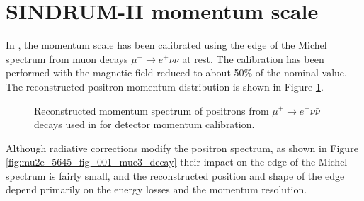 \newpage
\section {SINDRUM-II momentum scale }

In \cite{sindrum_ii:Bertl2006}, the momentum scale has been calibrated using
the edge of the Michel spectrum from muon decays $\mu^+ \rightarrow e^+ \nu \bar{\nu}$
at rest. The calibration has been performed with the magnetic field reduced to about 50\%
of the nominal value. The reconstructed positron momentum distribution is shown
in Figure \ref{fig:sindrum_ii_fig_08_fit}.

\begin{figure}
\caption{
  \label{fig:sindrum_ii_fig_08_fit}
  Reconstructed momentum spectrum of positrons from $\mu^+ \rightarrow e^+ \nu \bar{\nu}$
  decays used in \cite{sindrum_ii:Bertl2006} for detector momentum calibration.
}
\end{figure}

Although radiative corrections modify the positron spectrum, as shown in Figure \ref{fig:mu2e_5645_fig_001_mue3_decay} their impact on the edge of the Michel spectrum
is fairly small, and the reconstructed position and shape of the edge depend primarily
on the energy losses and the momentum resolution.

